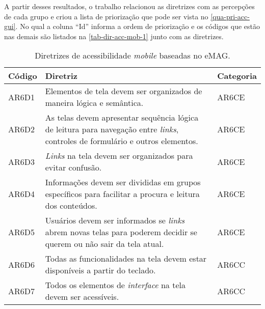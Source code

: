 A partir desses resultados, o trabalho relacionou as diretrizes com as percepções de cada grupo
e criou a lista de priorização que pode ser vista no \autoref{qua-pri-acc-gui}.
No qual a coluna ``Id'' informa a ordem de priorização e os códigos que estão nas demais são listados na \autoref{tab-dir-acc-mob-1} junto com as diretrizes.

\begin{table}[htb]
  \begin{center}
    \ABNTEXfontereduzida
    \caption{Diretrizes de acessibilidade \emph{mobile} baseadas no eMAG.}
    \label{tab-dir-acc-mob-1}
    \begin{tabular}{p{1.2cm}|p{12.0cm}|p{1.5cm}}
      \textbf{Código} & \textbf{Diretriz}                                                                                                                            & \textbf{Categoria} \\
      \hline
      AR6D1           & Elementos de tela devem ser organizados de maneira lógica e semântica.                                                                       & AR6CE              \\
      \hline
      AR6D2           & As telas devem apresentar sequência lógica de leitura para navegação entre \emph{links}, controles de formulário e outros elementos.         & AR6CE              \\
      \hline
      AR6D3           & \emph{Links} na tela devem ser organizados para evitar confusão.                                                                             & AR6CE              \\
      \hline
      AR6D4           & Informações devem ser divididas em grupos específicos para facilitar a procura e leitura dos conteúdos.                                      & AR6CE              \\
      \hline
      AR6D5           & Usuários devem ser informados se \emph{links} abrem novas telas para poderem decidir se querem ou não sair da tela atual.                    & AR6CE              \\
      \hline
      AR6D6           & Todas as funcionalidades na tela devem estar disponíveis a partir do teclado.                                                                & AR6CC              \\
      \hline
      AR6D7           & Todos os elementos de \emph{interface} na tela devem ser acessíveis.                                                                         & AR6CC              \\

\end{tabular}
\end{center}
\end{table}
